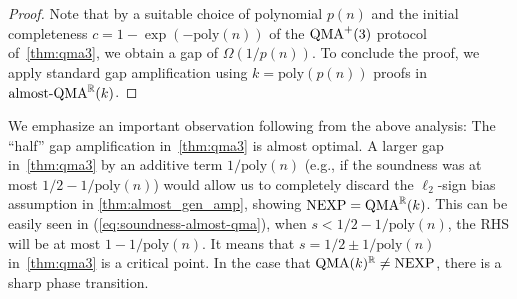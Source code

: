 \documentclass[10pt,a4paper]{article}
\theoremstyle{remark}
\newcommand{\eg}{e.g.,\xspace}
\newcommand{\R}{{\mathbb R}}
\newcommand{\poly}{{\mathrm{poly}}}
\newcommand{\1}[1]{\mathds{1}{[#1]}}
\newcommand{\QMA}{\textup{QMA}}
\newcommand{\NEXP}{\textup{NEXP}}
\numberwithin{equation}{section}
\begin{document}
\begin{proof}
Note that by a suitable choice of polynomial $p(n)$ and  the initial completeness $c=1-\exp(-\poly(n))$ of the $\QMA^+(3)$ protocol of~\cref{thm:qma3},
we obtain a gap of $\Omega(1/p(n))$. To conclude the proof, we apply standard gap amplification using $k=\poly(p(n))$ proofs in $\textup{almost-QMA}^\R(k)$.
\end{proof}

We emphasize an important observation following from the above analysis: The ``half'' gap amplification in~\cref{thm:qma3} is almost optimal. A larger gap in~\cref{thm:qma3} by an additive term $1/\poly(n)$ (\eg if the soundness was at most $1/2-1/\poly(n)$) would allow us to completely discard the $\ell_2$-sign bias assumption in \cref{thm:almost_gen_amp}, showing $\NEXP=\QMA^{\mathbb{R}}(k)$. This can be easily seen in (\ref{eq:soundness-almost-qma}), when $s<1/2-1/\poly(n)$, the RHS will be at most $1-1/\poly(n).$ It means that $s=1/2\pm 1/\poly(n)$ in~\cref{thm:qma3} is a critical point. In the case that $\QMA(k)^\R\not=\NEXP$, there is a sharp phase transition.
\end{document}
